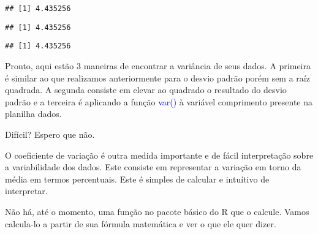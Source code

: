 \documentclass[titlepage, oneside, openany, a4paper]{book}
\newenvironment{Shaded}{\begin{snugshade}}{\end{snugshade}}
\newcommand{\DecValTok}[1]{\textcolor[rgb]{0.00,0.00,0.81}{#1}}
\newcommand{\KeywordTok}[1]{\textcolor[rgb]{0.13,0.29,0.53}{\textbf{#1}}}
\newcommand{\NormalTok}[1]{#1}
\newcommand{\OperatorTok}[1]{\textcolor[rgb]{0.81,0.36,0.00}{\textbf{#1}}}
\begin{document}
\begin{verbatim}
## [1] 4.435256
\end{verbatim}

\begin{Shaded}
\end{Shaded}

\begin{verbatim}
## [1] 4.435256
\end{verbatim}

\begin{Shaded}
\end{Shaded}

\begin{verbatim}
## [1] 4.435256
\end{verbatim}

Pronto, aqui estão 3 maneiras de encontrar a variância de seus dados. A primeira é similar ao que realizamos anteriormente para o desvio padrão porém sem a raíz quadrada. A segunda consiste em elevar ao quadrado o resultado do desvio padrão e a terceira é aplicando a função \textcolor{blue}{var()} à variável comprimento presente na planilha dados.

Difícil? Espero que não.

O coeficiente de variação é outra medida importante e de fácil interpretação sobre a variabilidade dos dados. Este consiste em representar a variação em torno da média em termos percentuais. Este é simples de calcular e intuítivo de interpretar.

Não há, até o momento, uma função no pacote básico do R que o calcule. Vamos calcula-lo a partir de sua fórmula matemática e ver o que ele quer dizer.

\begin{Shaded}
\end{Shaded}
\end{document}
